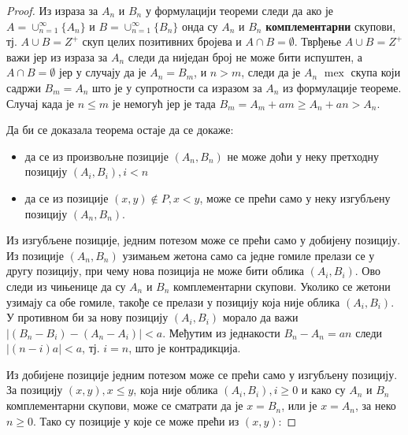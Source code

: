 \documentclass[a4paper]{article}
\DeclareMathOperator{\mex}{mex}
\begin{document}
\begin{proof}
	
	Из израза за $ A_{n} $ и $ B_{n} $ у формулацији теореми следи да ако је $ A = \cup_{n=1}^{\infty}\{A_{n}\} $ и  $ B = \cup_{n=1}^{\infty}\{B_{n}\} $ онда су $ A_{n} $ и $ B_{n} $ \textbf{комплементарни} скупови, тј. $ A \cup B = Z^{+} $ скуп целих позитивних бројева  и $ A \cap B = \emptyset $. Тврђење $ A \cup B = Z^{+} $ важи јер из израза за $ A_{n} $ следи да ниједан број не може бити испуштен, а $ A \cap B = \emptyset $ јер у случају да је $ A_{n} = B_{m} $, и $ n > m $, следи да је $ A_{n} $ $ \mex $ скупа који садржи $ B_{m} = A_{n} $ што је у супротности са изразом за $ A_{n} $ из формулације теореме. Случај када је $ n \leq m $ је немогућ јер је тада $ B_{m} = A_{m} + am \geq  A_{n} + an > A_{n} $. 
	
	Да би се доказала теорема остаје да се докаже:
	\begin{itemize}
		\item да се из произвољне позиције $ (A_{n}, B_{n}) $ не може доћи у неку претходну позицију $ (A_{i}, B_{i}), i < n $
		\item да се из позиције $ (x, y) \notin P, x < y $, може се прећи само у неку изгубљену позицију $ (A_{n}, B_{n}) $.
	\end{itemize}
	
	Из изгубљене позиције, једним потезом може се прећи само у добијену позицију. Из позиције $ (A_{n}, B_{n}) $ узимањем жетона само са једне гомиле прелази се у другу позицију, при чему нова позиција не може бити облика $ (A_{i}, B_{i}) $. Ово следи из чињенице да су  $ A_{n} $ и $ B_{n} $ комплементарни скупови. Уколико се жетони узимају са обе гомиле, такође се прелази у позицију која није облика $ (A_{i}, B_{i}) $. У противном би за нову позицију $ (A_{i}, B_{i}) $ морало да важи $ |(B_{n} - B_{i}) - (A_{n}-A_{i})| < a $. Међутим из једнакости $ B_{n} - A_{n} = an $ следи $ |(n-i)a| < a $, тј. $ i = n $, што је контрадикција. 
	
	Из добијене позиције једним потезом може се прећи само у изгубљену позицију. За позицију $ (x, y), x \le y $, која није облика $ (A_{i}, B_{i}), i \ge 0 $ и како су $ A_{n} $ и $ B_{n} $ комплементарни скупови, може се сматрати да је $ x = B_{n} $, или је $ x = A_{n} $, за неко $ n \ge 0 $. Тако су позиције у које се може прећи из $ (x, y) $:
	

\end{proof}
\end{document}
